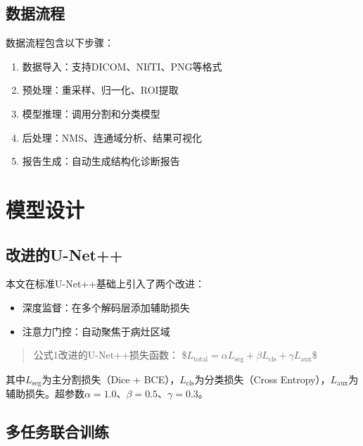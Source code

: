 \documentclass{harryopo-book}
\begin{document}
\subsection{数据流程}

数据流程包含以下步骤：

\begin{enumerate}
  \item {\fzht 数据导入}：支持DICOM、NIfTI、PNG等格式
  \item {\fzht 预处理}：重采样、归一化、ROI提取
  \item {\fzht 模型推理}：调用分割和分类模型
  \item {\fzht 后处理}：NMS、连通域分析、结果可视化
  \item {\fzht 报告生成}：自动生成结构化诊断报告
\end{enumerate}

\section{模型设计}

\subsection{改进的U-Net++}

本文在标准U-Net++基础上引入了两个改进：

\begin{itemize}
  \item {\fzht 深度监督}：在多个解码层添加辅助损失
  \item {\fzht 注意力门控}：自动聚焦于病灶区域
\end{itemize}

\begin{quote}
{\fzht 公式1}改进的U-Net++损失函数：
\$$L_{\text{total}} = \alpha L_{\text{seg}} + \beta L_{\text{cls}} + \gamma L_{\text{aux}}$\$
\end{quote}

其中$L_{\text{seg}}$为主分割损失（Dice + BCE），$L_{\text{cls}}$为分类损失（Cross Entropy），$L_{\text{aux}}$为辅助损失。超参数$\alpha = 1.0$、$\beta = 0.5$、$\gamma = 0.3$。

\subsection{多任务联合训练}
\end{document}
